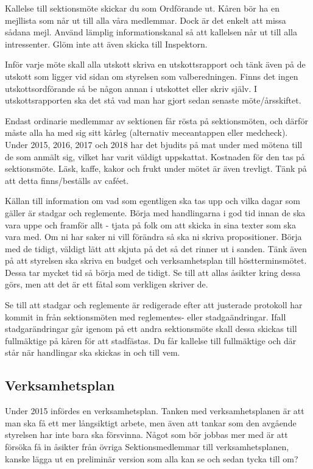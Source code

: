 \documentclass[10pt]{article}
\begin{document}
    Kallelse till sektionsmöte skickar du som Ordförande ut. Kåren bör ha en mejllista som når ut till alla våra medlemmar. Dock är det enkelt att missa sådana mejl. Använd lämplig informationskanal så att kallelsen når ut till alla intressenter. Glöm inte att även skicka till Inspektorn.
    
    Inför varje möte skall alla utskott skriva en utskottsrapport och tänk även på de utskott som ligger vid sidan om styrelsen som valberedningen. Finns det ingen utskottsordförande så be någon annan i utskottet eller skriv själv. I utskottsrapporten ska det stå vad man har gjort sedan senaste möte/årsskiftet.
    
    Endast ordinarie medlemmar av sektionen får rösta på sektionsmöten, och därför måste alla ha med sig sitt kårleg (alternativ meceantappen eller medcheck). Under 2015, 2016, 2017 och 2018 har det bjudits på mat under med mötena till de som anmält sig, vilket har varit väldigt uppskattat. Kostnaden för den tas på sektionsmöte. Läsk, kaffe, kakor och frukt under mötet är även trevligt. Tänk på att detta finns/beställs av caféet.
    
    Källan till information om vad som egentligen ska tas upp och vilka dagar som gäller är stadgar och reglemente. Börja med handlingarna i god tid innan de ska vara uppe och framför allt - tjata på folk om att skicka in sina texter som ska vara med. Om ni har saker ni vill förändra så ska ni skriva propositioner. Börja med de tidigt, väldigt lätt att skjuta på det så det rinner ut i sanden. Tänk även på att styrelsen ska skriva en budget och verksamhetsplan till höstterminsmötet. Dessa tar mycket tid så börja med de tidigt. Se till att allas åsikter kring dessa görs, men att det är ett fåtal som verkligen skriver de.
    
    Se till att stadgar och reglemente är redigerade efter att justerade protokoll har kommit in från sektionsmöten med reglementes- eller stadgaändringar. Ifall stadgarändringar går igenom på ett andra sektionsmöte skall dessa skickas till fullmäktige på kåren för att stadfästas. Du får kallelse till fullmäktige och där står när handlingar ska skickas in och till vem.
    
    \subsection{Verksamhetsplan}
    
    Under 2015 infördes en verksamhetsplan. Tanken med verksamhetsplanen är att man ska få ett mer långsiktigt arbete, men även att tankar som den avgående styrelsen har inte bara ska försvinna. Något som bör jobbas mer med är att försöka få in åsikter från övriga Sektionsmedlemmar till verksamhetsplanen, kanske lägga ut en preliminär version som alla kan se och sedan tycka till om?
    
\end{document}
